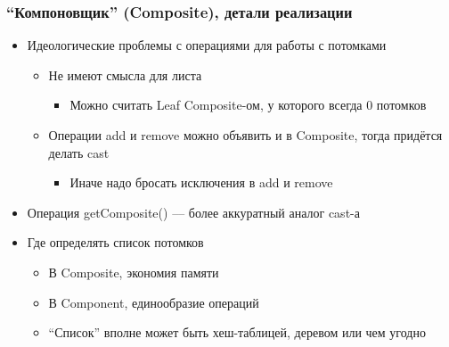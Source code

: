 \documentclass{../cscslides}
\begin{document}
    \begin{frame}
        \frametitle{``Компоновщик'' (Composite), детали реализации}
        \begin{itemize}
            \item Идеологические проблемы с операциями для работы с потомками
            \begin{itemize}
                \item Не имеют смысла для листа
                \begin{itemize}
                    \item Можно считать Leaf Composite-ом, у которого всегда 0 потомков
                \end{itemize}
                \item Операции add и remove можно объявить и в Composite, тогда придётся делать cast
                \begin{itemize}
                    \item Иначе надо бросать исключения в add и remove
                \end{itemize}
            \end{itemize}
            \item Операция getComposite() –-- более аккуратный аналог cast-а
            \item Где определять список потомков
            \begin{itemize}
                \item В Composite, экономия памяти
                \item В Component, единообразие операций
                \item ``Список'' вполне может быть хеш-таблицей, деревом или чем угодно
            \end{itemize}
        \end{itemize}
    \end{frame}
\end{document}

